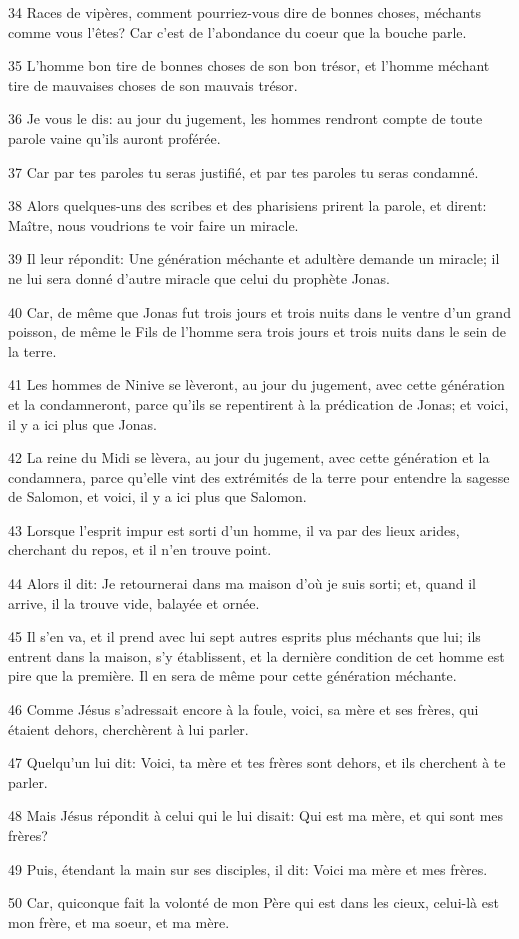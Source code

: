 \par 34 Races de vipères, comment pourriez-vous dire de bonnes choses, méchants comme vous l'êtes? Car c'est de l'abondance du coeur que la bouche parle.
\par 35 L'homme bon tire de bonnes choses de son bon trésor, et l'homme méchant tire de mauvaises choses de son mauvais trésor.
\par 36 Je vous le dis: au jour du jugement, les hommes rendront compte de toute parole vaine qu'ils auront proférée.
\par 37 Car par tes paroles tu seras justifié, et par tes paroles tu seras condamné.
\par 38 Alors quelques-uns des scribes et des pharisiens prirent la parole, et dirent: Maître, nous voudrions te voir faire un miracle.
\par 39 Il leur répondit: Une génération méchante et adultère demande un miracle; il ne lui sera donné d'autre miracle que celui du prophète Jonas.
\par 40 Car, de même que Jonas fut trois jours et trois nuits dans le ventre d'un grand poisson, de même le Fils de l'homme sera trois jours et trois nuits dans le sein de la terre.
\par 41 Les hommes de Ninive se lèveront, au jour du jugement, avec cette génération et la condamneront, parce qu'ils se repentirent à la prédication de Jonas; et voici, il y a ici plus que Jonas.
\par 42 La reine du Midi se lèvera, au jour du jugement, avec cette génération et la condamnera, parce qu'elle vint des extrémités de la terre pour entendre la sagesse de Salomon, et voici, il y a ici plus que Salomon.
\par 43 Lorsque l'esprit impur est sorti d'un homme, il va par des lieux arides, cherchant du repos, et il n'en trouve point.
\par 44 Alors il dit: Je retournerai dans ma maison d'où je suis sorti; et, quand il arrive, il la trouve vide, balayée et ornée.
\par 45 Il s'en va, et il prend avec lui sept autres esprits plus méchants que lui; ils entrent dans la maison, s'y établissent, et la dernière condition de cet homme est pire que la première. Il en sera de même pour cette génération méchante.
\par 46 Comme Jésus s'adressait encore à la foule, voici, sa mère et ses frères, qui étaient dehors, cherchèrent à lui parler.
\par 47 Quelqu'un lui dit: Voici, ta mère et tes frères sont dehors, et ils cherchent à te parler.
\par 48 Mais Jésus répondit à celui qui le lui disait: Qui est ma mère, et qui sont mes frères?
\par 49 Puis, étendant la main sur ses disciples, il dit: Voici ma mère et mes frères.
\par 50 Car, quiconque fait la volonté de mon Père qui est dans les cieux, celui-là est mon frère, et ma soeur, et ma mère.

